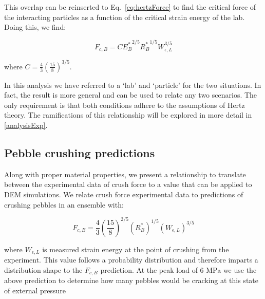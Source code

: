 This overlap can be reinserted to Eq.~\ref{eq:hertzForce} to find the critical force of the interacting particles as a function of the critical strain energy of the lab. Doing this, we find:

\begin{equation}\label{eq:peb_hertz}
	F_{c,B} = C{E_B^*}^{2/5}{R_B^*}^{1/5}W_{\epsilon,L}^{3/5}
\end{equation}

where $C = \frac{4}{3}\left(\frac{15}{8}\right)^{3/5}$.

In this analysis we have referred to a `lab' and `particle' for the two situations. In fact, the result is more general and can be used to relate any two scenarios. The only requirement is that both conditions adhere to the assumptions of Hertz theory. The ramifications of this relationship will be explored in more detail in \cref{analysisExp}.





\subsection{Pebble crushing predictions}
Along with proper material properties, we present a relationship to translate between the experimental data of crush force to a value that can be applied to DEM simulations. We relate crush force experimental data to predictions of crushing pebbles in an ensemble with:

\begin{equation}\label{eq:crush-predict}
  F_{c,B} = \frac{4}{3} \left(\frac{15}{8}\right)^{2/5}\left(R_B^* \right)^{1/5}\left( W_{\epsilon,L} \right)^{3/5}
\end{equation}

where $W_{\epsilon,L}$ is measured strain energy at the point of crushing from the experiment. This value follows a probability distribution and therefore imparts a distribution shape to the $F_{c,B}$ prediction. At the peak load of 6 MPa we use the above prediction to determine how many pebbles would be cracking at this state of external pressure